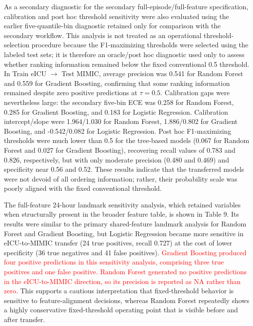 \documentclass[utf8]{FrontiersinHarvard} %
\begin{document}
As a secondary diagnostic for the secondary full-episode/full-feature specification, calibration and post hoc threshold sensitivity were also evaluated using the earlier five-quantile-bin diagnostic retained only for comparison with the secondary workflow. This analysis is not treated as an operational threshold-selection procedure because the F1-maximizing thresholds were selected using the labeled test sets; it is therefore an oracle/post hoc diagnostic used only to assess whether ranking information remained below the fixed conventional 0.5 threshold. In Train eICU $\rightarrow$ Test MIMIC, average precision was 0.541 for Random Forest and 0.559 for Gradient Boosting, confirming that some ranking information remained despite zero positive predictions at $\tau=0.5$. Calibration gaps were nevertheless large: the secondary five-bin ECE was 0.258 for Random Forest, 0.285 for Gradient Boosting, and 0.183 for Logistic Regression. Calibration intercept/slope were 1.964/1.030 for Random Forest, 1.886/0.802 for Gradient Boosting, and -0.542/0.082 for Logistic Regression. Post hoc F1-maximizing thresholds were much lower than 0.5 for the tree-based models (0.067 for Random Forest and 0.027 for Gradient Boosting), recovering recall values of 0.783 and 0.826, respectively, but with only moderate precision (0.480 and 0.469) and specificity near 0.56 and 0.52. These results indicate that the transferred models were not devoid of all ordering information; rather, their probability scale was poorly aligned with the fixed conventional threshold.

The full-feature 24-hour landmark sensitivity analysis, which retained variables when structurally present in the broader feature table, is shown in Table 9. Its results were similar to the primary shared-feature landmark analysis for Random Forest and Gradient Boosting, but Logistic Regression became more sensitive in eICU-to-MIMIC transfer (24 true positives, recall 0.727) at the cost of lower specificity (36 true negatives and 41 false positives). \textcolor{red}{Gradient Boosting produced four positive predictions in this sensitivity analysis, comprising three true positives and one false positive. Random Forest generated no positive predictions in the eICU-to-MIMIC direction, so its precision is reported as NA rather than zero.} This supports a cautious interpretation that fixed-threshold behavior is sensitive to feature-alignment decisions, whereas Random Forest repeatedly shows a highly conservative fixed-threshold operating point that is visible before and after transfer.
\end{document}
